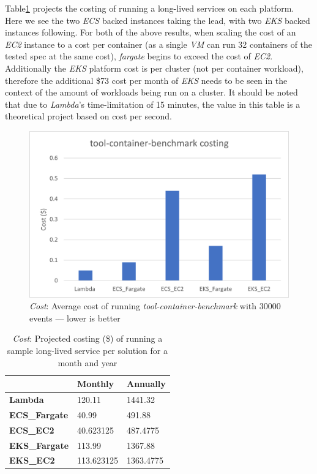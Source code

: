 Table\ref{fig:cost_projected} projects the costing of running a long-lived services on each platform. Here we see the two \textit{ECS} backed instances taking the lead,
with two \textit{EKS} backed instances following. For both of the above results, when scaling the cost of an \textit{EC2} instance to a cost per container
(as a single \textit{VM} can run 32 containers of the tested spec at the same cost), \textit{fargate} begins to exceed the cost of \textit{EC2}.
Additionally the \textit{EKS} platform cost is per cluster (not per container workload), therefore the additional \$73 cost per month of \textit{EKS} needs to be seen in the context of the amount of workloads being run on a cluster.
It should be noted that due to \textit{Lambda}'s time-limitation of 15 minutes, the value in this table is a theoretical project based on cost per second.

\begin{figure}[htbp]
  \includegraphics[width=\textwidth]{images/cost-workload.png}
  \caption{\emph{Cost}: Average cost of running \emph{tool-container-benchmark} with 30000 events --- lower is better}
  \label{fig:cost_workload}
\end{figure}

\begin{table}[htbp]
  \caption{\emph{Cost}: Projected costing (\$) of running a sample long-lived service per solution for a month and year}
  \small
  \begin{tabularx}{1\textwidth}{X | X | X }
    \space            & \bf{Monthly} & \bf{Annually} \\
    \hline
    \bf{Lambda      } & 120.11       & 1441.32       \\
    \bf{ECS\_Fargate} & 40.99        & 491.88        \\
    \bf{ECS\_EC2    } & 40.623125    & 487.4775      \\
    \bf{EKS\_Fargate} & 113.99       & 1367.88       \\
    \bf{EKS\_EC2    } & 113.623125   & 1363.4775     \\
  \end{tabularx}
  \label{fig:cost_projected}
\end{table}


